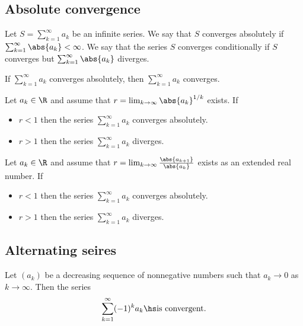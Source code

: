 \documentclass{article}
\begin{document}
\subsection{Absolute convergence}

\begin{definition}
	Let $S=\sum_{k=1}^\infty a_k$ be an infinite series. We say that $S$ converges
	absolutely if $\sum_{k=1}^\infty \abs{a_k}<\infty$. We say that the series
	$S$ converges conditionally if $S$ converges but $\sum_{k=1}^\infty\abs{a_k}$
	diverges.
\end{definition}

\begin{theorem}
	If $\sum_{k=1}^\infty a_k$ converges absolutely, then $\sum_{k=1}^\infty a_k$
	converges.
\end{theorem}

\begin{theorem}
	Let $a_k\in\R$ and assume that $r=\lim_{k\to\infty} \abs{a_k}^{1/k}$
	exists. If
	\begin{itemize}
		\item $r<1$ then the series $\sum_{k=1}^\infty a_k$ converges absolutely.
		\item $r>1$ then the series $\sum_{k=1}^\infty a_k$ diverges.
	\end{itemize}
\end{theorem}

\setcounter{theorem}{4}
\begin{theorem}
	Let $a_k\in\R$ and assume that $r=\lim_{k\to\infty}\frac{\abs{a_{k+1}}}{\abs{a_k}}$
	exists as an extended real number. If
	\begin{itemize}
		\item $r<1$ then the series $\sum_{k=1}^\infty a_k$ converges absolutely.
		\item $r>1$ then the series $\sum_{k=1}^\infty a_k$ diverges.
	\end{itemize}
\end{theorem}

\subsection{Alternating seires}

\begin{theorem}
	Let $(a_k)$ be a decreasing sequence of nonnegative numbers such that
	$a_k\to 0$ as $k\to\infty$. Then the series
	\begin{align*}
		\sum_{k=1}^\infty (-1)^k a_k\hs\text{is convergent}.
	\end{align*}
\end{theorem}
\end{document}
